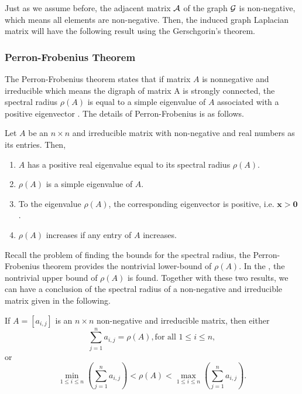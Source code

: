 Just as we assume before, the adjacent matrix ${\cal A}$ of the graph
${\cal G}$ is non-negative, which means all elements are non-negative.
Then, the induced graph Laplacian matrix will have the following result
using the Gerschgorin's theorem. 




\subsubsection{Perron-Frobenius Theorem}

The Perron-Frobenius theorem states that if matrix $A$ is nonnegative
and irreducible which means the digraph of matrix A is strongly connected,
the spectral radius $\rho(A)$ is equal to a simple eigenvalue of
$A$ associated with a positive eigenvector \cite{Piziak2007}. The
details of Perron-Frobenius is as follows.
\begin{thm}
\label{thm:Perron-Frobenius thm.} Let $A$ be an $n\times n$ and
irreducible matrix with non-negative and real numbers as its entries.
Then, \end{thm}
\begin{enumerate}
\item $A$ has a positive real eigenvalue equal to its spectral radius $\rho\left(A\right)$.
\item $\rho\left(A\right)$ is a simple eigenvalue of $A$.
\item To the eigenvalue $\rho\left(A\right)$, the corresponding eigenvector
is positive, i.e. $\mathbf{x}>\mathbf{0}$.
\item $\rho\left(A\right)$ increases if any entry of $A$ increases.
\end{enumerate}
Recall the problem of finding the bounds for the spectral radius,
the Perron-Frobenius theorem provides the nontrivial lower-bound of
$\rho\left(A\right)$. In the ,
the nontrivial upper bound of $\rho\left(A\right)$ is found. Together
with these two results, we can have a conclusion of the spectral radius
of a non-negative and irreducible matrix given in the following.
\begin{lem}
If $A=\left[a_{i,j}\right]$ is an $n\times n$ non-negative and irreducible
matrix, then either 
\begin{equation}
\sum_{j=1}^{n}a_{i,j}=\rho\left(A\right),\mbox{for all }1\leq i\leq n,
\end{equation}
or 
\begin{equation}
\min_{1\leq i\leq n}\left(\sum_{j=1}^{n}a_{i,j}\right)<\rho\left(A\right)<\max_{1\leq i\leq n}\left(\sum_{j=1}^{n}a_{i,j}\right).
\end{equation}
\end{lem}
